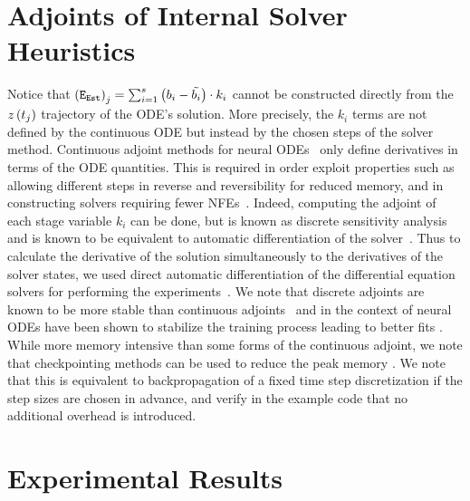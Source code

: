 \section{Adjoints of Internal Solver Heuristics}
\label{sec:adjoints_of_internal_solver_heuristics}

Notice that $\left(\texttt{E}_{\texttt{Est}}\right)_j = \sum_{i = 1}^s \left(b_i - \tilde{b_i}\right) \cdot k_i$ cannot be constructed directly from the $z\left(t_j\right)$ trajectory of the ODE's solution. More precisely, the $k_i$ terms are not defined by the continuous ODE but instead by the chosen steps of the solver method. Continuous adjoint methods for neural ODEs~\citep{chen2018neural, zhuang2021mali} only define derivatives in terms of the ODE quantities. This is required in order exploit properties such as allowing different steps in reverse and reversibility for reduced memory, and in constructing solvers requiring fewer NFEs~\citep{kidger2021hey}. Indeed, computing the adjoint of each stage variable $k_i$ can be done, but is known as discrete sensitivity analysis and is known to be equivalent to automatic differentiation of the solver~\citep{zhang2014fatode}. Thus to calculate the derivative of the solution simultaneously to the derivatives of the solver states, we used direct automatic differentiation of the differential equation solvers for performing the experiments~\citep{innes2018don}. We note that discrete adjoints are known to be more stable than continuous adjoints~\citep{zhang2014fatode} and in the context of neural ODEs have been shown to stabilize the training process leading to better fits \citep{gholami2019anode,onken2020discretize}. While more memory intensive than some forms of the continuous adjoint, we note that checkpointing methods can be used to reduce the peak memory \citep{dauvergne2006data}. We note that this is equivalent to backpropagation of a fixed time step discretization if the step sizes are chosen in advance, and verify in the example code that no additional overhead is introduced.


\section{Experimental Results}
\label{sec:experimental_results_global_regularized_neural_des}

